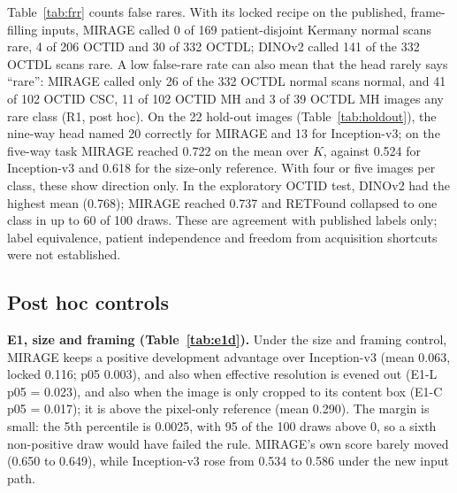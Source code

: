 \documentclass[conference]{IEEEtran}
\begin{document}
Table~\ref{tab:frr} counts false rares. With its locked recipe on the published, frame-filling inputs, MIRAGE called 0 of 169 patient-disjoint Kermany normal scans rare, 4 of 206 OCTID and 30 of 332 OCTDL; DINOv2 called 141 of the 332 OCTDL scans rare. A low false-rare rate can also mean that the head rarely says ``rare'': MIRAGE called only 26 of the 332 OCTDL normal scans normal, and 41 of 102 OCTID CSC, 11 of 102 OCTID MH and 3 of 39 OCTDL MH images any rare class (R1, post hoc).
On the 22 hold-out images (Table~\ref{tab:holdout}), the nine-way head named 20 correctly for MIRAGE and 13 for Inception-v3; on the five-way task MIRAGE reached 0.722 on the mean over $K$, against 0.524 for Inception-v3 and 0.618 for the size-only reference. With four or five images per class, these show direction only. In the exploratory OCTID test, DINOv2 had the highest mean (0.768); MIRAGE reached 0.737 and RETFound collapsed to one class in up to 60 of 100 draws. These are agreement with published labels only; label equivalence, patient independence and freedom from acquisition shortcuts were not established.

\subsection{Post hoc controls}
\textbf{E1, size and framing (Table~\ref{tab:e1d}).} Under the size and framing control, MIRAGE keeps a positive development advantage over Inception-v3 (mean 0.063, locked 0.116; p05 0.003), and also when effective resolution is evened out (E1-L p05 = 0.023), and also when the image is only cropped to its content box (E1-C p05 = 0.017); it is above the pixel-only reference (mean 0.290). The margin is small: the 5th percentile is 0.0025, with 95 of the 100 draws above 0, so a sixth non-positive draw would have failed the rule. MIRAGE's own score barely moved (0.650 to 0.649), while Inception-v3 rose from 0.534 to 0.586 under the new input path.
\end{document}
